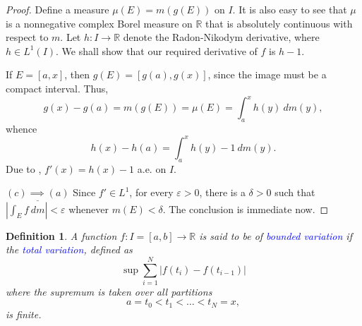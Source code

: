 \documentclass[12pt]{article}
\theoremstyle{thmstyle}
\theoremstyle{defstyle}
\newtheorem{definition}[theorem]{Definition}
\newcommand{\R}{\mathbb{R}}
\newcommand{\define}[1]{\textcolor{blue}{\textit{#1}}}
\begin{document}
\begin{proof}
Define a measure $\mu(E) = m(g(E))$ on $I$. It is also easy to see that $\mu$ is a nonnegative complex Borel measure on $\R$ that is absolutely continuous with respect to $m$. Let $h: I\to\R$ denote the Radon-Nikodym derivative, where $h\in L^1(I)$. We shall show that our required derivative of $f$ is $h - 1$.

If $E = [a, x]$, then $g(E) = [g(a), g(x)]$, since the image must be a compact interval. Thus, 
\begin{equation*}
    g(x) - g(a) = m(g(E)) = \mu(E) = \int_a^x h(y)~dm(y),
\end{equation*}
whence 
\begin{equation*}
    h(x) - h(a) = \int_a^x h(y) - 1~dm(y).
\end{equation*}
Due to , $f'(x) = h(x) - 1$ a.e. on $I$.

\noindent$\underline{(c)\implies(a)}$ Since $f'\in L^1$, for every $\varepsilon > 0$, there is a $\delta > 0$ such that $\left|\int_E f~dm\right|< \varepsilon$ whenever $m(E) < \delta$. The conclusion is immediate now.
\end{proof}

\begin{definition}
    A function $f: I = [a,b]\to\R$ is said to be of \define{bounded variation} if the \define{total variation}, defined as
    \begin{equation*}
        \sup\sum_{i = 1}^N |f(t_i) - f(t_{i - 1})|
    \end{equation*}
    where the supremum is taken over all partitions 
    \begin{equation*}
        a = t_0 < t_1 < \dots < t_N = x,
    \end{equation*}
    is finite.
\end{definition}
\end{document}
